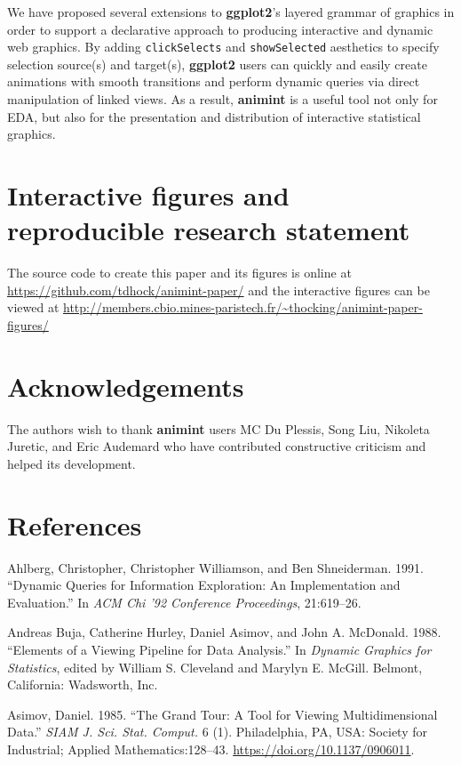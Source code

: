 \documentclass[12pt,]{article}
\theoremstyle{definition}
\theoremstyle{definition}
\theoremstyle{definition}
\theoremstyle{remark}
\begin{document}
We have proposed several extensions to \textbf{ggplot2}'s layered
grammar of graphics in order to support a declarative approach to
producing interactive and dynamic web graphics. By adding
\texttt{clickSelects} and \texttt{showSelected} aesthetics to specify
selection source(s) and target(s), \textbf{ggplot2} users can quickly
and easily create animations with smooth transitions and perform dynamic
queries via direct manipulation of linked views. As a result,
\textbf{animint} is a useful tool not only for EDA, but also for the
presentation and distribution of interactive statistical graphics.

\section*{Interactive figures and reproducible research statement}

The source code to create this paper and its figures is online at
\url{https://github.com/tdhock/animint-paper/} and the interactive
figures can be viewed at
\url{http://members.cbio.mines-paristech.fr/~thocking/animint-paper-figures/}

\section*{Acknowledgements}

The authors wish to thank \textbf{animint} users MC Du Plessis, Song
Liu, Nikoleta Juretic, and Eric Audemard who have contributed
constructive criticism and helped its development.

\section*{References}

\hypertarget{refs}{}
\leavevmode\hypertarget{ref-Ahlberg:1991}{}%
Ahlberg, Christopher, Christopher Williamson, and Ben Shneiderman. 1991.
``Dynamic Queries for Information Exploration: An Implementation and
Evaluation.'' In \emph{ACM Chi '92 Conference Proceedings}, 21:619--26.

\leavevmode\hypertarget{ref-viewing-pipeline}{}%
Andreas Buja, Catherine Hurley, Daniel Asimov, and John A. McDonald.
1988. ``Elements of a Viewing Pipeline for Data Analysis.'' In
\emph{Dynamic Graphics for Statistics}, edited by William S. Cleveland
and Marylyn E. McGill. Belmont, California: Wadsworth, Inc.

\leavevmode\hypertarget{ref-grand-tour}{}%
Asimov, Daniel. 1985. ``The Grand Tour: A Tool for Viewing
Multidimensional Data.'' \emph{SIAM J. Sci. Stat. Comput.} 6 (1).
Philadelphia, PA, USA: Society for Industrial; Applied
Mathematics:128--43. \url{https://doi.org/10.1137/0906011}.
\end{document}
